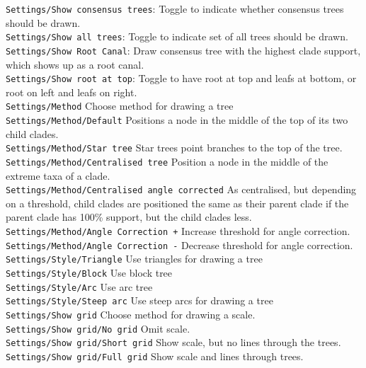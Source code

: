 \documentclass{article}
\begin{document}
\noindent
{\tt Settings/Show consensus trees}: Toggle to indicate whether consensus trees 
should be drawn.\\
{\tt Settings/Show all trees}: Toggle to indicate set of all trees should be drawn.\\
{\tt Settings/Show Root Canal}: Draw consensus tree with the highest clade support, which shows
up as a root canal.\\
{\tt Settings/Show root at top}: Toggle to have root at top and leafs at bottom, or
root on left and leafs on right.\\
%

\noindent
{\tt Settings/Method} Choose method for drawing a tree\\
{\tt Settings/Method/Default} Positions a node in the middle of the top of its two child clades.\\
{\tt Settings/Method/Star tree} Star trees point branches to the top of the tree.\\
{\tt Settings/Method/Centralised tree} Position a node in the middle of the extreme taxa of a clade.\\
{\tt Settings/Method/Centralised angle corrected} As centralised, but depending on a threshold, child clades
are positioned the same as their parent clade if the parent clade has 100\% support, but the child clades
less.\\
{\tt Settings/Method/Angle Correction +} Increase threshold for angle correction.\\
{\tt Settings/Method/Angle Correction -} Decrease threshold for angle correction.\\

\noindent
{\tt Settings/Style/Triangle} Use triangles for drawing a tree\\
{\tt Settings/Style/Block} Use block tree\\
{\tt Settings/Style/Arc} Use arc tree\\
{\tt Settings/Style/Steep arc} Use steep arcs for drawing a tree\\

\noindent
{\tt Settings/Show grid} Choose method for drawing a scale.\\
{\tt Settings/Show grid/No grid} Omit scale.\\
{\tt Settings/Show grid/Short grid} Show scale, but no lines through the trees.\\
{\tt Settings/Show grid/Full grid} Show scale and lines through trees.\\
\end{document}
